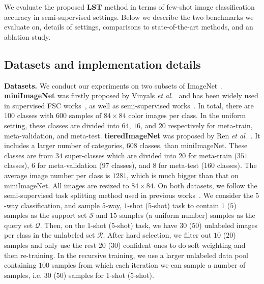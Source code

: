 \documentclass{article}
\newcommand{\myparagraph}[1]{\vspace{0.1em}\noindent\textbf{#1}}
\begin{document}
We evaluate the proposed \textbf{LST} method in terms of few-shot image classification accuracy in semi-supervised settings.
Below we describe the two benchmarks we evaluate on, details of settings, comparisons to state-of-the-art methods, and an ablation study.


\subsection{Datasets and implementation details}
\label{sec_dataset_settings}

\myparagraph{Datasets.} We conduct our experiments on two subsets of ImageNet~\cite{Russakovsky2015}.
\textbf{miniImageNet} was firstly proposed by Vinyals \emph{et al}.~\cite{VinyalsBLKW16} and has been widely used in supervised FSC works~\cite{FinnAL17, RaviICLR2017, SunCVPR2019, RusuICLR2019, GrantICLR2018, FranceschiICML18}, as well as semi-supervised works~\cite{LiuICLR2019transductive, RenICLR2018_semisupervised}. 
In total, there are $100$ classes with $600$ samples of $84 \times 84$ color images per class. 
In the uniform setting, these classes are divided into $64$, $16$, and $20$ respectively for meta-train, meta-validation, and meta-test.
\textbf{tieredImageNet} was proposed by Ren \emph{et al}.~\cite{RenICLR2018_semisupervised}. 
It includes a larger number of categories,  $608$ classes, than miniImageNet.
These classes are from $34$ super-classes which are divided into $20$ for meta-train ($351$ classes), $6$ for meta-validation ($97$ classes), 
and $8$ for meta-test ($160$ classes).
The average image number per class is $1281$, which is much bigger than that on miniImageNet. 
All images are resized to $84\times 84$. On both datasets, we follow the semi-supervised task splitting method used in previous works~\cite{RenICLR2018_semisupervised, LiuICLR2019transductive}.
We consider the $5$-way classification, and sample $5$-way, $1$-shot ($5$-shot) task to contain $1$ ($5$) samples as the support set $\mathcal{S}$ and $15$ samples (a uniform number) samples as the query set $\mathcal{Q}$. 
Then, on the $1$-shot ($5$-shot) task, we have $30$ ($50$) unlabeled images per class in the unlabeled set $\mathcal{R}$.
After hard selection, we filter out $10$ ($20$) samples and only use the rest $20$ ($30$) confident ones to do soft weighting and then re-training.
In the recursive training, we use a larger unlabeled data pool containing $100$ samples from which each iteration we can sample a number of samples, i.e. $30$ ($50$) samples for 1-shot (5-shot).
\end{document}
